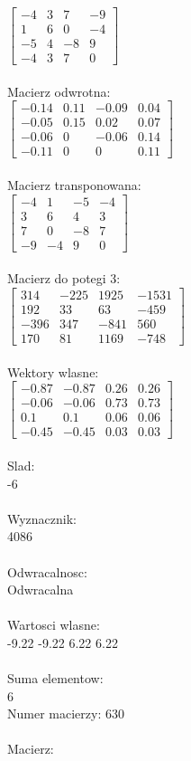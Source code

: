 \documentclass[a4paper,12pt]{article}
\begin{document}
$\begin{bmatrix} -4&3&7&-9\\1&6&0&-4\\-5&4&-8&9\\-4&3&7&0 \end{bmatrix}$
\\
\\
Macierz odwrotna:\\

$\begin{bmatrix} -0.14&0.11&-0.09&0.04\\-0.05&0.15&0.02&0.07\\-0.06&0&-0.06&0.14\\-0.11&0&0&0.11 \end{bmatrix}$
\\
\\
Macierz transponowana:\\

$\begin{bmatrix} -4&1&-5&-4\\3&6&4&3\\7&0&-8&7\\-9&-4&9&0 \end{bmatrix}$
\\
\\
Macierz do potegi 3:\\

$\begin{bmatrix} 314&-225&1925&-1531\\192&33&63&-459\\-396&347&-841&560\\170&81&1169&-748 \end{bmatrix}$
\\
\\
Wektory wlasne:\\

$\begin{bmatrix} -0.87&-0.87&0.26&0.26\\-0.06&-0.06&0.73&0.73\\0.1&0.1&0.06&0.06\\-0.45&-0.45&0.03&0.03 \end{bmatrix}$
\\
\\
Slad:\\
-6
\\
\\
Wyznacznik:\\
4086
\\
\\
Odwracalnosc:\\
Odwracalna
\\
\\
Wartosci wlasne:\\
-9.22 -9.22 6.22 6.22
\\
\\
Suma elementow:\\
6
\\
\newpage
Numer macierzy:
630
\\
\\
Macierz:\\
\end{document}
